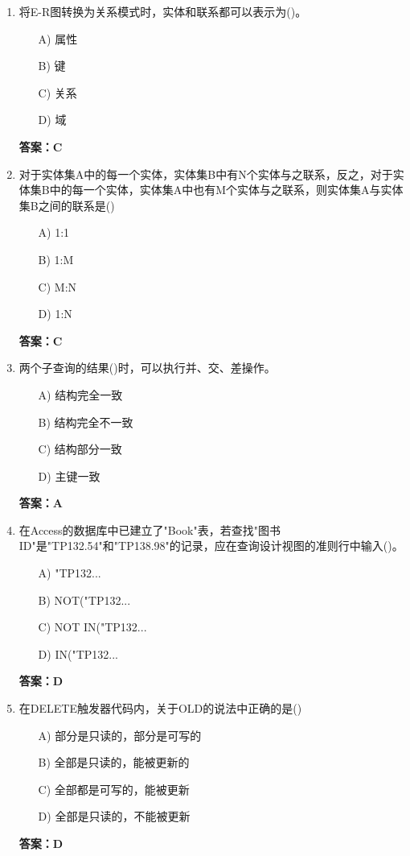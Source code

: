 \documentclass[a4paper,12pt]{article}
\begin{document}
\begin{enumerate}[label=\arabic*.]
\item 将E-R图转换为关系模式时，实体和联系都可以表示为()。
\begin{itemize}
    \item[A)] 属性
    \item[B)] 键
    \item[C)] 关系
    \item[D)] 域
\end{itemize}
\textbf{答案：C}

\item 对于实体集A中的每一个实体，实体集B中有N个实体与之联系，反之，对于实体集B中的每一个实体，实体集A中也有M个实体与之联系，则实体集A与实体集B之间的联系是()
\begin{itemize}
    \item[A)] 1:1
    \item[B)] 1:M
    \item[C)] M:N
    \item[D)] 1:N
\end{itemize}
\textbf{答案：C}

\item 两个子查询的结果()时，可以执行并、交、差操作。
\begin{itemize}
    \item[A)] 结构完全一致
    \item[B)] 结构完全不一致
    \item[C)] 结构部分一致
    \item[D)] 主键一致
\end{itemize}
\textbf{答案：A}

\item 在Access的数据库中已建立了"Book"表，若查找"图书ID"是"TP132.54"和"TP138.98"的记录，应在查询设计视图的准则行中输入()。
\begin{itemize}
    \item[A)] "TP132...
    \item[B)] NOT("TP132...
    \item[C)] NOT IN("TP132...
    \item[D)] IN("TP132...
\end{itemize}
\textbf{答案：D}

\item 在DELETE触发器代码内，关于OLD的说法中正确的是()
\begin{itemize}
    \item[A)] 部分是只读的，部分是可写的
    \item[B)] 全部是只读的，能被更新的
    \item[C)] 全部都是可写的，能被更新
    \item[D)] 全部是只读的，不能被更新
\end{itemize}
\textbf{答案：D}


\end{enumerate}
\end{document}

